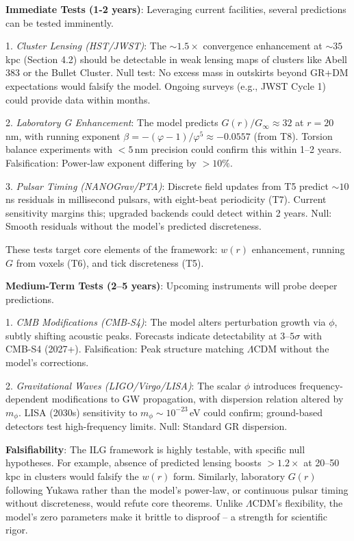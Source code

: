 \documentclass[12pt,a4paper]{article}
\begin{document}
\textbf{Immediate Tests (1-2 years)}: Leveraging current facilities, several predictions can be tested imminently.

1. \emph{Cluster Lensing (HST/JWST)}: The $\sim 1.5\times$ convergence enhancement at $\sim 35$\,kpc (Section 4.2) should be detectable in weak lensing maps of clusters like Abell 383 or the Bullet Cluster. Null test: No excess mass in outskirts beyond GR+DM expectations would falsify the model. Ongoing surveys (e.g., JWST Cycle 1) could provide data within months.

2. \emph{Laboratory G Enhancement}: The model predicts $G(r)/G_\infty \approx 32$ at $r=20$\,nm, with running exponent $\beta = -(\varphi-1)/\varphi^5 \approx -0.0557$ (from T8). Torsion balance experiments with $<5$\,nm precision could confirm this within 1--2 years. Falsification: Power-law exponent differing by $>10\%$.

3. \emph{Pulsar Timing (NANOGrav/PTA)}: Discrete field updates from T5 predict $\sim 10$\,ns residuals in millisecond pulsars, with eight-beat periodicity (T7). Current sensitivity margins this; upgraded backends could detect within 2 years. Null: Smooth residuals without the model's predicted discreteness.

These tests target core elements of the framework: $w(r)$ enhancement, running $G$ from voxels (T6), and tick discreteness (T5).

\textbf{Medium-Term Tests (2--5 years)}: Upcoming instruments will probe deeper predictions.

1. \emph{CMB Modifications (CMB-S4)}: The model alters perturbation growth via $\phi$, subtly shifting acoustic peaks. Forecasts indicate detectability at $3$--$5\sigma$ with CMB-S4 (2027+). Falsification: Peak structure matching $\Lambda$CDM without the model's corrections.

2. \emph{Gravitational Waves (LIGO/Virgo/LISA)}: The scalar $\phi$ introduces frequency-dependent modifications to GW propagation, with dispersion relation altered by $m_\phi$. LISA (2030s) sensitivity to $m_\phi \sim 10^{-23}$\,eV could confirm; ground-based detectors test high-frequency limits. Null: Standard GR dispersion.

\textbf{Falsifiability}: The ILG framework is highly testable, with specific null hypotheses. For example, absence of predicted lensing boosts $>1.2\times$ at 20--50\,kpc in clusters would falsify the $w(r)$ form. Similarly, laboratory $G(r)$ following Yukawa rather than the model's power-law, or continuous pulsar timing without discreteness, would refute core theorems. Unlike $\Lambda$CDM's flexibility, the model's zero parameters make it brittle to disproof -- a strength for scientific rigor.
\end{document}
